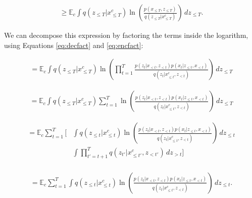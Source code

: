 \begin{equation} 
\begin{aligned}
\displaystyle
    \geq \mathbb{E}_c \int \mathit{q}(z_{\leq T}|x^c_{\leq T}) \ln \left( \frac{\mathit{p}(x_{\leq T},z_{\leq T})}{\mathit{q}(z_{\leq T}|x^c_{\leq T})} \right) \,dz_{\leq T}.
\end{aligned} \label{rnn:eq_loglike}
\end{equation}

We can decompose this expression by factoring the terms inside the logarithm, using Equations \ref{eq:decfact} and \ref{eq:encfact}:

\begin{equation} 
\begin{aligned}
\displaystyle
= \mathbb{E}_c \int \mathit{q}(z_{\leq T}|x^c_{\leq T}) \ln \left( \prod^T_{t=1} \frac{\mathit{p}(z_t |x_{< t}, z_{< t})\mathit{p}(x_t |z_{\leq t}, x_{< t})}{\mathit{q}(z_t |x^c_{\leq t}, z_{< t})} \right) \,dz_{\leq T}
\end{aligned}
\end{equation}

\begin{equation} 
\begin{aligned}
\displaystyle
= \mathbb{E}_c \int \mathit{q}(z_{\leq T}|x^c_{\leq T}) \sum^T_{t=1} \ln \left( \frac{\mathit{p}(z_t |x_{< t}, z_{< t})\mathit{p}(x_t |z_{\leq t}, x_{< t})}{\mathit{q}(z_t |x^c_{\leq t}, z_{< t})} \right) \,dz_{\leq T}
\end{aligned}
\end{equation}

\begin{equation} 
\begin{aligned}
\displaystyle
= \mathbb{E}_c  \sum^T_{t=1} \Big[ & \int \mathit{q}(z_{\leq t}|x^c_{\leq t}) \ln \left( \frac{\mathit{p}(z_t |x_{< t}, z_{< t})\mathit{p}(x_t |z_{\leq t}, x_{< t})}{\mathit{q}(z_t |x^c_{\leq t}, z_{< t})} \right)\, dz_{\leq t} \\
& \int \prod^T_{t'=t+1} \mathit{q}(z_{t'}|x^c_{\leq t'}, z_{<t'}) \, dz_{>t} \Big] \\
\end{aligned}
\end{equation}

\begin{equation} 
\begin{aligned}
\displaystyle
= \mathbb{E}_c \sum^T_{t=1} \int \mathit{q}(z_{\leq t}|x^c_{\leq t}) \ln \left( \frac{\mathit{p}(z_t |x_{< t}, z_{< t})\mathit{p}(x_t |z_{\leq t}, x_{< t})}{\mathit{q}(z_t |x^c_{\leq t}, z_{< t})} \right)\, dz_{\leq t}.
\end{aligned}
\end{equation}


